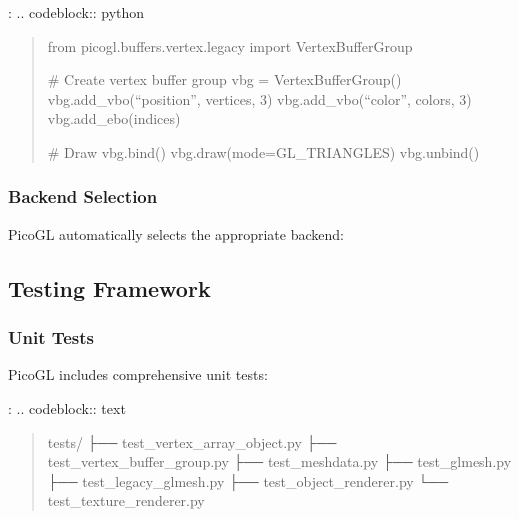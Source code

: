 \documentclass[a4paper,10pt,english,openany,oneside]{sphinxmanual}
\begin{document}
\sphinxAtStartPar
{}:
.. code\sphinxhyphen{}block:: python
\begin{quote}

\sphinxAtStartPar
from picogl.buffers.vertex.legacy import VertexBufferGroup

\sphinxAtStartPar
\# Create vertex buffer group
vbg = VertexBufferGroup()
vbg.add\_vbo(“position”, vertices, 3)
vbg.add\_vbo(“color”, colors, 3)
vbg.add\_ebo(indices)

\sphinxAtStartPar
\# Draw
vbg.bind()
vbg.draw(mode=GL\_TRIANGLES)
vbg.unbind()
\end{quote}


\subsubsection{Backend Selection}
\label{\detokenize{development:backend-selection}}
\sphinxAtStartPar
PicoGL automatically selects the appropriate backend:

\begin{sphinxVerbatim}[commandchars=\\\{\}]
     
         
     
         
         
\end{sphinxVerbatim}


\subsection{Testing Framework}
\label{\detokenize{development:testing-framework}}

\subsubsection{Unit Tests}
\label{\detokenize{development:unit-tests}}
\sphinxAtStartPar
PicoGL includes comprehensive unit tests:

\sphinxAtStartPar
{}:
.. code\sphinxhyphen{}block:: text
\begin{quote}

\sphinxAtStartPar
tests/
├── test\_vertex\_array\_object.py
├── test\_vertex\_buffer\_group.py
├── test\_meshdata.py
├── test\_glmesh.py
├── test\_legacy\_glmesh.py
├── test\_object\_renderer.py
└── test\_texture\_renderer.py
\end{quote}
\end{document}
